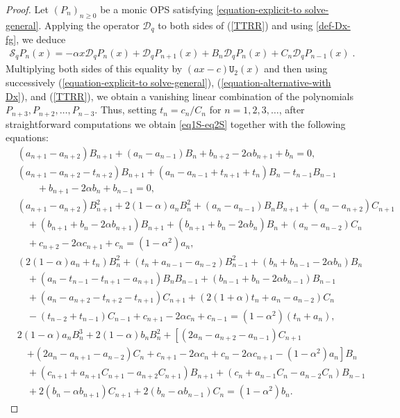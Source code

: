 \documentclass{amsart}
\theoremstyle{remark}
\numberwithin{equation}{section}
\begin{document}
\begin{proof}
Let $(P_n)_{n\geq0}$ be a monic OPS satisfying \eqref{equation-explicit-to solve-general}.
Applying the operator $\mathcal{D}_q$ to both sides of (\ref{TTRR}) and using \eqref{def-Dx-fg}, we deduce
\begin{align*}
\mathcal{S}_q P_n(x) =- \alpha x\mathcal{D}_q P_n(x) +\mathcal{D}_q P_{n+1}(x) +B_n \mathcal{D}_q P_n(x) +C_n \mathcal{D}_q P_{n-1}(x)\;.
\end{align*}
Multiplying both sides of this equality by $(ax-c)\mathtt{U}_2(x)$ and then using successively (\ref{equation-explicit-to solve-general}), (\ref{equation-alternative-with Dx}), and (\ref{TTRR}), we obtain
a vanishing linear combination of the polynomials $P_{n+3}, P_{n+2}, \dots,P_{n-3}$.
Thus, setting
$t_n=c_n/C_n$ for $n=1,2,3,\ldots$,  %
after straightforward computations we obtain \eqref{eq1S-eq2S} together with the following equations:
\begin{align}
&\label{seq3S} (a_{n+1}-a_{n+2})B_{n+1} +(a_n -a_{n-1})B_n +b_{n+2}-2\alpha b_{n+1}+b_n =0 , \\
&\label{seq4S} (a_{n+1}-a_{n+2}-t_{n+2})B_{n+1} +(a_{n}-a_{n-1}+t_{n+1}+t_{n})B_n -t_{n-1} B_{n-1} \\ 
&\nonumber  \quad\quad  +b_{n+1}-2\alpha b_{n}+b_{n-1} =0 , \\
&\label{seq5S} (a_{n+1}-a_{n+2})B_{n+1}^2+2(1-\alpha)a_nB_n^2+(a_n-a_{n-1})B_n B_{n+1}+ (a_n -a_{n+2})C_{n+1}  \\ 
&\nonumber \quad +(b_{n+1}+b_n-2\alpha b_{n+1})B_{n+1} +(b_{n+1}+b_n -2\alpha b_{n} )B_n  +(a_n - a_{n-2})C_n\\ 
&\nonumber \quad +c_{n+2}-2\alpha c_{n+1}+c_n  = (1-\alpha ^2)a_n ,\\
&\label{seq6S} (2(1-\alpha)a_n+t_n)B_{n}^2 + (t_n +a_{n-1}-a_{n-2})B_{n-1}^2+(b_{n} +b_{n-1} -2\alpha b_{n})B_{n} \\ 
&\nonumber \quad +(a_n-t_{n-1}-t_{n+1}-a_{n+1})B_n B_{n-1} +(b_{n-1}+b_n -2\alpha b_{n-1} )B_{n-1} \\ 
&\nonumber \quad +(a_n-a_{n+2}-t_{n+2}-t_{n+1})C_{n+1}+( 2(1+\alpha)t_n+a_n-a_{n-2})C_n  \\
&\nonumber \quad -(t_{n-2}+t_{n-1})C_{n-1} +c_{n+1}-2\alpha c_{n}+c_{n-1} = (1-\alpha^2)(t_n+a_n)  ,\\
&\label{seq7S} 2(1-\alpha)a_nB_n^3 +2(1-\alpha)b_nB_{n}^2 +\left[ (2a_n -a_{n+2}-a_{n-1})C_{n+1}\right.\\
&\nonumber \quad \left. + (2a_n -a_{n+1}-a_{n-2})C_n  + c_{n+1}-2\alpha c_n +c_n -2\alpha c_{n+1}  - (1-\alpha^2) a_n \right] B_{n} \\ 
&\nonumber \quad +(c_{n+1}+a_{n+1}C_{n+1}-a_{n+2}C_{n+1})B_{n+1} +(c_n +a_{n-1}C_{n}-a_{n-2}C_n)B_{n-1} \\ 
&\nonumber \quad +2(b_n -\alpha b_{n+1})C_{n+1} +2(b_n -\alpha b_{n-1} )C_n   = (1 -\alpha^2)b_n .
\end{align}


\end{proof}
\end{document}
